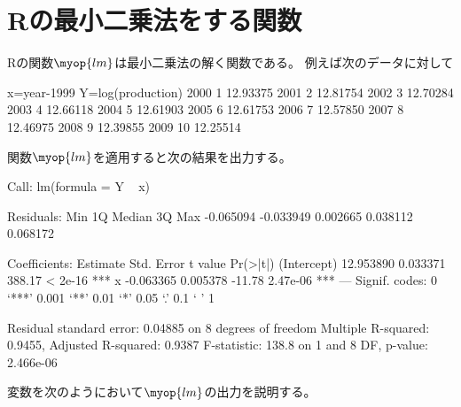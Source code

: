 \section{Rの最小二乗法をする関数}\label{s1:Rの最小二乗法をする関数} %
	Rの関数$\myop{lm}$は最小二乗法の解く関数である。
	例えば次のデータに対して
	\begin{cprog}
				 x=year-1999 Y=log(production)
		2000           1          12.93375
		2001           2          12.81754
		2002           3          12.70284
		2003           4          12.66118
		2004           5          12.61903
		2005           6          12.61753
		2006           7          12.57850
		2007           8          12.46975
		2008           9          12.39855
		2009          10          12.25514
	\end{cprog}
	関数$\myop{lm}$を適用すると次の結果を出力する。
	\begin{cprog}
		Call:
		lm(formula = Y ~ x)

		Residuals:
					Min        1Q    Median        3Q       Max 
		-0.065094 -0.033949  0.002665  0.038112  0.068172 

		Coefficients:
								 Estimate Std. Error t value Pr(>|t|)    
		(Intercept) 12.953890   0.033371  388.17  < 2e-16 ***
		x           -0.063365   0.005378  -11.78 2.47e-06 ***
		---
		Signif. codes:  0 ‘***’ 0.001 ‘**’ 0.01 ‘*’ 0.05 ‘.’ 0.1 ‘ ’ 1 

		Residual standard error: 0.04885 on 8 degrees of freedom
		Multiple R-squared: 0.9455,     Adjusted R-squared: 0.9387 
		F-statistic: 138.8 on 1 and 8 DF,  p-value: 2.466e-06
	\end{cprog}
	変数を次のようにおいて$\myop{lm}$の出力を説明する。
